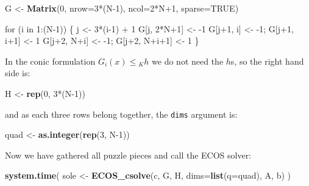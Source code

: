 \documentclass[]{article}
\newenvironment{Shaded}{\begin{snugshade}}{\end{snugshade}}
\newcommand{\KeywordTok}[1]{\textcolor[rgb]{0.13,0.29,0.53}{\textbf{{#1}}}}
\newcommand{\DataTypeTok}[1]{\textcolor[rgb]{0.13,0.29,0.53}{{#1}}}
\newcommand{\DecValTok}[1]{\textcolor[rgb]{0.00,0.00,0.81}{{#1}}}
\newcommand{\StringTok}[1]{\textcolor[rgb]{0.31,0.60,0.02}{{#1}}}
\newcommand{\OtherTok}[1]{\textcolor[rgb]{0.56,0.35,0.01}{{#1}}}
\newcommand{\NormalTok}[1]{{#1}}
\begin{document}
\begin{Shaded}
\begin{Highlighting}[]
\NormalTok{G <-}\StringTok{ }\KeywordTok{Matrix}\NormalTok{(}\DecValTok{0}\NormalTok{, }\DataTypeTok{nrow=}\DecValTok{3}\NormalTok{*(N}\DecValTok{-1}\NormalTok{), }\DataTypeTok{ncol=}\DecValTok{2}\NormalTok{*N}\DecValTok{+1}\NormalTok{, }\DataTypeTok{sparse=}\OtherTok{TRUE}\NormalTok{)}

\NormalTok{for (i in }\DecValTok{1}\NormalTok{:(N}\DecValTok{-1}\NormalTok{)) \{}
    \NormalTok{j <-}\StringTok{ }\DecValTok{3}\NormalTok{*(i}\DecValTok{-1}\NormalTok{) +}\StringTok{ }\DecValTok{1}
    \NormalTok{G[j, }\DecValTok{2}\NormalTok{*N}\DecValTok{+1}\NormalTok{] <-}\StringTok{ }\NormalTok{-}\DecValTok{1}
    \NormalTok{G[j}\DecValTok{+1}\NormalTok{, i] <-}\StringTok{ }\NormalTok{-}\DecValTok{1}\NormalTok{; G[j}\DecValTok{+1}\NormalTok{, i}\DecValTok{+1}\NormalTok{] <-}\StringTok{ }\DecValTok{1}
    \NormalTok{G[j}\DecValTok{+2}\NormalTok{, N+i] <-}\StringTok{ }\NormalTok{-}\DecValTok{1}\NormalTok{; G[j}\DecValTok{+2}\NormalTok{, N+i}\DecValTok{+1}\NormalTok{] <-}\StringTok{ }\DecValTok{1}
\NormalTok{\}}
\end{Highlighting}
\end{Shaded}

In the conic formulation \(G_i(x) \le{}_K h\) we do not need the \(h\)s,
so the right hand side is:

\begin{Shaded}
\begin{Highlighting}[]
\NormalTok{H <-}\StringTok{ }\KeywordTok{rep}\NormalTok{(}\DecValTok{0}\NormalTok{, }\DecValTok{3}\NormalTok{*(N}\DecValTok{-1}\NormalTok{))}
\end{Highlighting}
\end{Shaded}

and as each three rows belong together, the \texttt{dims} argument is:

\begin{Shaded}
\begin{Highlighting}[]
\NormalTok{quad <-}\StringTok{ }\KeywordTok{as.integer}\NormalTok{(}\KeywordTok{rep}\NormalTok{(}\DecValTok{3}\NormalTok{, N}\DecValTok{-1}\NormalTok{))}
\end{Highlighting}
\end{Shaded}

Now we have gathered all puzzle pieces and call the ECOS solver:

\begin{Shaded}
\begin{Highlighting}[]
\KeywordTok{system.time}\NormalTok{(}
  \NormalTok{sole <-}\StringTok{ }\KeywordTok{ECOS_csolve}\NormalTok{(c, G, H, }\DataTypeTok{dims=}\KeywordTok{list}\NormalTok{(}\DataTypeTok{q=}\NormalTok{quad), A, b)}
\NormalTok{)}
\end{Highlighting}
\end{Shaded}
\end{document}
